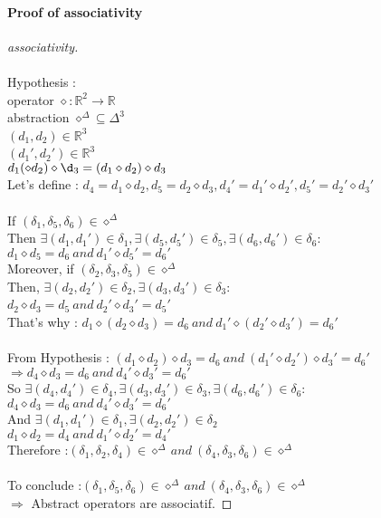 \documentclass[a4paper,10pt]{report}
\begin{document}
\paragraph{Proof of associativity}
  \begin{proof}[associativity]
    ~\\~\\Hypothesis : 
    ~\\operator $ \diamond : {\mathbb{R}}^2 \rightarrow \mathbb{R}$
   ~\\ abstraction $ {\diamond}^\Delta \subseteq {\Delta}^3 $
   ~\\ $(d_{1}, d_{2}) \in \mathbb{R}^3 $
   ~\\ $(d_{1}', d_{2}') \in \mathbb{R}^3 $
   ~\\ $d_{1} (\diamond d_{2}) \diamond \d_3 = (d_1 \diamond d_{2}) \diamond d_{3}$
   \\ Let's define : $d_4 = d_1 \diamond d_2 , d_5 = d_2 \diamond d_3 , d_4' = d_1' \diamond d_2' , d_5' = d_2' \diamond d_3'$
   \\
   ~\\ If $ (\delta_1,\delta_5, \delta_6) \in \diamond^\Delta$
   ~\\Then $\exists (d_1,d_1') \in \delta_1 , \exists (d_5,d_5') \in \delta_5 , \exists (d_6,d_6') \in \delta_6 : $
   ~\\$d_1 \diamond d_5 = d_6\ and\ d_1' \diamond d_5' = d_6' $
   \\Moreover, if $ (\delta_2,\delta_3, \delta_5) \in \diamond^\Delta$
   ~\\ Then, $ \exists (d_2,d_2') \in \delta_2 , \exists (d_3,d_3') \in \delta_3 :$
   ~\\ $ d_2 \diamond d_3 = d_5\ and\ d_2' \diamond d_3' = d_5' $
   ~\\ That's why : $ d_1 \diamond ( d_2 \diamond d_3) = d_6\ and\ d_1' \diamond ( d_2' \diamond d_3') = d_6'$
   \\
   ~\\From Hypothesis : $(d_1 \diamond d_2) \diamond d_3 = d_6\ and\ (d_1' \diamond d_2') \diamond d_3' = d_6'$
   ~\\ $\Rightarrow d_4 \diamond d_3 = d_6\ and\ d_4' \diamond d_3' = d_6'$
   \\ So $ \exists (d_4,d_4') \in \delta_4 , \exists (d_3,d_3') \in \delta_3 , \exists (d_6,d_6') \in \delta_6 :$
   ~\\ $ d_4 \diamond d_3 = d_6\ and\ d_4' \diamond d_3' = d_6'$
   \\ And $  \exists (d_1,d_1') \in \delta_1 , \exists (d_2,d_2') \in \delta_2 $
   ~\\ $ d_1 \diamond d_2 = d_4\ and\ d_1' \diamond d_2' = d_4'$ 
   \\Therefore :$ (\delta_1, \delta_2, \delta_4) \in \diamond^\Delta\ and\ (\delta_4, \delta_3, \delta_6) \in \diamond^\Delta$ \\
   \\To conclude :$ (\delta_1, \delta_5, \delta_6) \in \diamond^\Delta\ and\ (\delta_4, \delta_3, \delta_6) \in \diamond^\Delta$
   ~\\ $\Rightarrow$ Abstract operators are associatif.
  \end{proof}
\end{document}
